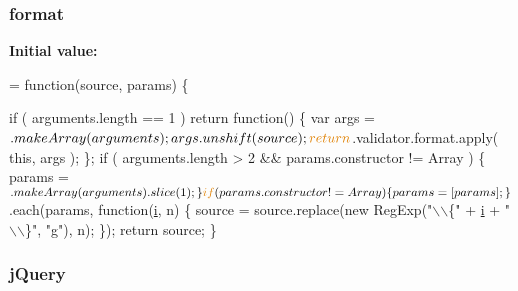 \subsubsection[{format}]{\setlength{\rightskip}{0pt plus 5cm}format}\label{packages_2j_query_8_validation_81_811_81_2_content_2_scripts_2jquery_8validate-vsdoc_8js_a387137c43ed9616d39ba90e890d181eb}
{\bfseries Initial value\+:}
\begin{DoxyCode}
= \textcolor{keyword}{function}(source, params) \{
    

    \textcolor{keywordflow}{if} ( arguments.length == 1 ) 
        \textcolor{keywordflow}{return} \textcolor{keyword}{function}() \{
            var args = $.makeArray(arguments);
            args.unshift(source);
            \textcolor{keywordflow}{return} $.validator.format.apply( \textcolor{keyword}{this}, args );
        \};
    \textcolor{keywordflow}{if} ( arguments.length > 2 && params.constructor != Array  ) \{
        params = $.makeArray(arguments).slice(1);
    \}
    \textcolor{keywordflow}{if} ( params.constructor != Array ) \{
        params = [ params ];
    \}
    $.each(params, \textcolor{keyword}{function}(\hyperlink{_bibabook_2_scripts_2respond_8min_8js_a5e25b1d1bed9ab5f3174b76d6a722180}{i}, n) \{
        source = source.replace(\textcolor{keyword}{new} RegExp(\textcolor{stringliteral}{"\(\backslash\)\(\backslash\)\{"} + \hyperlink{_bibabook_2_scripts_2respond_8min_8js_a5e25b1d1bed9ab5f3174b76d6a722180}{i} + \textcolor{stringliteral}{"\(\backslash\)\(\backslash\)\}"}, \textcolor{stringliteral}{"g"}), n);
    \});
    \textcolor{keywordflow}{return} source;
\}
\end{DoxyCode}
\hypertarget{packages_2j_query_8_validation_81_811_81_2_content_2_scripts_2jquery_8validate-vsdoc_8js_a2b1d6f9c448e3ce72f4e1865d6e38d2c}{}
\subsubsection[{j\+Query}]{\setlength{\rightskip}{0pt plus 5cm}j\+Query}\label{packages_2j_query_8_validation_81_811_81_2_content_2_scripts_2jquery_8validate-vsdoc_8js_a2b1d6f9c448e3ce72f4e1865d6e38d2c}
\hypertarget{packages_2j_query_8_validation_81_811_81_2_content_2_scripts_2jquery_8validate-vsdoc_8js_a2dc8272bb221cdffcccbd20db038f172}{}
